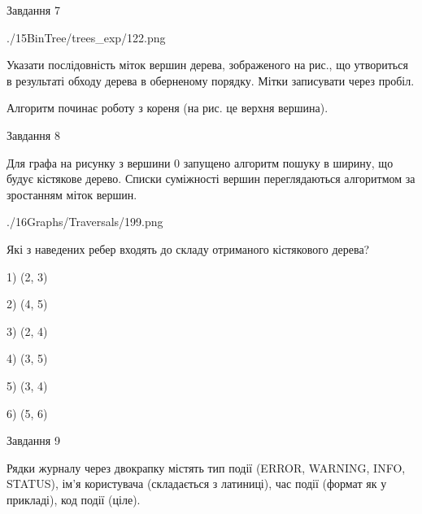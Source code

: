 \documentclass[12pt, ukrainian]{article}
\begin{document}
{\vspace{10mm}\par

\newpage
\begin{minipage}[t]{9.7cm}
               
{\begin{center}Завдання {7}\end{center}}
\vspace{-6mm}

\begin{center}
	{./15BinTree/trees_exp/122.png}
\end{center}
Указати послідовність міток вершин дерева, зображеного на рис., що утвориться в результаті обходу дерева в оберненому порядку. Мітки записувати через пробіл.\par Алгоритм починає роботу з кореня (на рис. це верхня вершина).\par

\end{minipage}
\vline \hspace{8mm}
\begin{minipage}[t]{8.0cm}
               
{\begin{center}Завдання {8}\end{center}}
\vspace{-6mm}
Для графа на рисунку з вершини 0 запущено алгоритм пошуку в ширину, що будує кістякове дерево. Списки суміжності вершин переглядаються алгоритмом за зростанням міток вершин.\par
\begin{center}
	{./16Graphs/Traversals/199.png}
\end{center}
\par Які з наведених ребер входять до складу отриманого кістякового дерева?\par
1) (2, 3)\par
2) (4, 5)\par
3) (2, 4)\par
4) (3, 5)\par
5) (3, 4)\par
6) (5, 6)\par
{\vskip 15pt} \par

\end{minipage}

               
{\begin{center}Завдання {9}\end{center}}
\vspace{-6mm}
Рядки журналу через двокрапку містять тип події (ERROR, WARNING, INFO, STATUS), ім'я користувача (складається з латиниці), час події (фор\-мат як у прикладі), код події (ціле).

}
\end{document}

